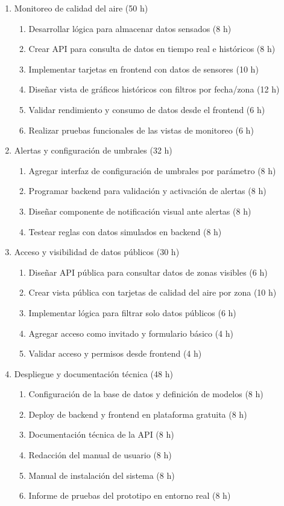 \documentclass[
11pt, %
]{charter}
\begin{document}
\begin{enumerate}
    \item Monitoreo de calidad del aire (50 h)
    \begin{enumerate}
        \item Desarrollar lógica para almacenar datos sensados (8 h)
        \item Crear API para consulta de datos en tiempo real e históricos (8 h)
        \item Implementar tarjetas en frontend con datos de sensores (10 h)
        \item Diseñar vista de gráficos históricos con filtros por fecha/zona (12 h)
        \item Validar rendimiento y consumo de datos desde el frontend (6 h)
        \item Realizar pruebas funcionales de las vistas de monitoreo (6 h)
    \end{enumerate}

    \item Alertas y configuración de umbrales (32 h)
    \begin{enumerate}
        \item Agregar interfaz de configuración de umbrales por parámetro (8 h)
        \item Programar backend para validación y activación de alertas (8 h)
        \item Diseñar componente de notificación visual ante alertas (8 h)
        \item Testear reglas con datos simulados en backend (8 h)
    \end{enumerate}

    \item Acceso y visibilidad de datos públicos (30 h)
    \begin{enumerate}
        \item Diseñar API pública para consultar datos de zonas visibles (6 h)
        \item Crear vista pública con tarjetas de calidad del aire por zona (10 h)
        \item Implementar lógica para filtrar solo datos públicos (6 h)
        \item Agregar acceso como invitado y formulario básico (4 h)
        \item Validar acceso y permisos desde frontend (4 h)
    \end{enumerate}

    \item Despliegue y documentación técnica (48 h)
    \begin{enumerate}
        \item Configuración de la base de datos y definición de modelos (8 h)
        \item Deploy de backend y frontend en plataforma gratuita (8 h)
        \item Documentación técnica de la API (8 h)
        \item Redacción del manual de usuario (8 h)
        \item Manual de instalación del sistema (8 h)
        \item Informe de pruebas del prototipo en entorno real (8 h)
    \end{enumerate}


\end{enumerate}
\end{document}
